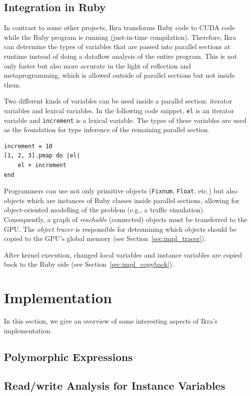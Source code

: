 \documentclass{sigplanconf}
\begin{document}
\subsection{Integration in Ruby}
In contrast to some other projects, Ikra transforms Ruby code to CUDA code while the Ruby program is running (just-in-time compilation). Therefore, Ikra can determine the types of variables that are passed into parallel sections at runtime instead of doing a dataflow analysis of the entire program. This is not only faster but also more accurate in the light of reflection and metaprogramming, which is allowed outside of parallel sections but not inside them.

Two different kinds of variables can be used inside a parallel section: iterator variables and lexical variables. In the following code snippet, \texttt{el} is an iterator variable and \texttt{increment} is a lexical variable. The types of these variables are used as the foundation for type inference of the remaining parallel section.
\begin{lstlisting}
increment = 10
[1, 2, 3].pmap do |el|
    el + increment
end
\end{lstlisting}

Programmers can use not only primitive objects (\texttt{Fixnum}, \texttt{Float}, etc.) but also objects which are instances of Ruby classes inside parallel sections, allowing for object-oriented modelling of the problem (e.g., a traffic simulation). Consequently, a graph of \emph{reachable} (connected) objects must be transferred to the GPU. The \emph{object tracer} is responsible for determining which objects should be copied to the GPU's global memory (see Section~\ref{sec:impl_tracer}).

After kernel execution, changed local variables and instance variables are copied back to the Ruby side (see Section~\ref{sec:impl_copyback}).


\section{Implementation}
In this section, we give an overview of some interesting aspects of Ikra's implementation.

\subsection{Polymorphic Expressions}
\label{sec:polymorphic}

\subsection{Read/write Analysis for Instance Variables}
\end{document}
